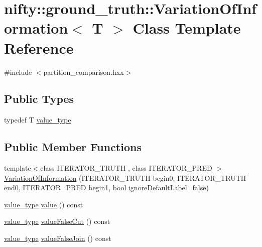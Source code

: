 \hypertarget{classnifty_1_1ground__truth_1_1VariationOfInformation}{}\section{nifty\+:\+:ground\+\_\+truth\+:\+:Variation\+Of\+Information$<$ T $>$ Class Template Reference}
\label{classnifty_1_1ground__truth_1_1VariationOfInformation}


{\ttfamily \#include $<$partition\+\_\+comparison.\+hxx$>$}

\subsection*{Public Types}
\begin{DoxyCompactItemize}
\item 
typedef T \hyperlink{classnifty_1_1ground__truth_1_1VariationOfInformation_ad0f4a205d57087c7641664b76410e40c}{value\+\_\+type}
\end{DoxyCompactItemize}
\subsection*{Public Member Functions}
\begin{DoxyCompactItemize}
\item 
{\footnotesize template$<$class I\+T\+E\+R\+A\+T\+O\+R\+\_\+\+T\+R\+U\+T\+H , class I\+T\+E\+R\+A\+T\+O\+R\+\_\+\+P\+R\+E\+D $>$ }\\\hyperlink{classnifty_1_1ground__truth_1_1VariationOfInformation_a3b6f86e4d5d3d98fe0dacb5ec2a1c2df}{Variation\+Of\+Information} (I\+T\+E\+R\+A\+T\+O\+R\+\_\+\+T\+R\+U\+T\+H begin0, I\+T\+E\+R\+A\+T\+O\+R\+\_\+\+T\+R\+U\+T\+H end0, I\+T\+E\+R\+A\+T\+O\+R\+\_\+\+P\+R\+E\+D begin1, bool ignore\+Default\+Label=false)
\item 
\hyperlink{classnifty_1_1ground__truth_1_1VariationOfInformation_ad0f4a205d57087c7641664b76410e40c}{value\+\_\+type} \hyperlink{classnifty_1_1ground__truth_1_1VariationOfInformation_a1db34d44fab8a175aa7391125c58b523}{value} () const 
\item 
\hyperlink{classnifty_1_1ground__truth_1_1VariationOfInformation_ad0f4a205d57087c7641664b76410e40c}{value\+\_\+type} \hyperlink{classnifty_1_1ground__truth_1_1VariationOfInformation_a82640ee618c754cd75b73ba190766108}{value\+False\+Cut} () const 
\item 
\hyperlink{classnifty_1_1ground__truth_1_1VariationOfInformation_ad0f4a205d57087c7641664b76410e40c}{value\+\_\+type} \hyperlink{classnifty_1_1ground__truth_1_1VariationOfInformation_adf55a3b83b9906b4f1c4dbd1a081ecc9}{value\+False\+Join} () const 
\end{DoxyCompactItemize}


